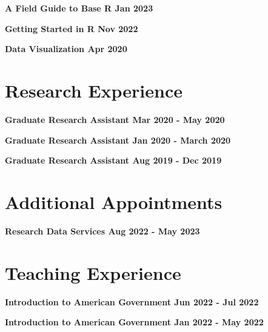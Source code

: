 \documentclass[margin]{res}
\newcommand{\fullhrulefill}{%
  \hspace*{-\sectionwidth}\hrulefill%
  }
\begin{document}
\begin{resume}
\textbf{A Field Guide to Base R \hfill{Jan 2023} \\}

\textbf{Getting Started in R \hfill{Nov 2022} \\}

\textbf{Data Visualization \hfill{Apr 2020} \\}


\fullhrulefill
\section{ Research Experience}

\textbf {Graduate Research Assistant \hfill {Mar 2020 - May 2020} \\ }

\textbf {Graduate Research Assistant \hfill {Jan 2020 - March 2020} \\ }

\textbf {Graduate Research Assistant \hfill {Aug 2019 - Dec 2019} \\ }


\fullhrulefill
\section{Additional Appointments}

\textbf{Research Data Services \hfill {Aug 2022 - May 2023} \\ }

\fullhrulefill
\section {Teaching Experience}

\textbf {Introduction to American Government \hfill {Jun 2022 - Jul 2022} \\ }

\textbf {Introduction to American Government \hfill {Jan 2022 - May 2022} \\ }



\end{resume}
\end{document}
